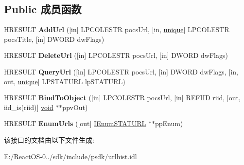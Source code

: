 \subsection*{Public 成员函数}
\begin{DoxyCompactItemize}
\item 
\mbox{\label{interface_i_url_history_stg_a1ce772b52c50301726ed33bfd9731d3a}} 
H\+R\+E\+S\+U\+LT {\bfseries Add\+Url} (\mbox{[}in\mbox{]} L\+P\+C\+O\+L\+E\+S\+TR pocs\+Url, \mbox{[}in, \hyperlink{interfaceunique}{unique}\mbox{]} L\+P\+C\+O\+L\+E\+S\+TR pocs\+Title, \mbox{[}in\mbox{]} D\+W\+O\+RD dw\+Flags)
\item 
\mbox{\label{interface_i_url_history_stg_aa5f15d49b1c791fb9435e4ef1073bdce}} 
H\+R\+E\+S\+U\+LT {\bfseries Delete\+Url} (\mbox{[}in\mbox{]} L\+P\+C\+O\+L\+E\+S\+TR pocs\+Url, \mbox{[}in\mbox{]} D\+W\+O\+RD dw\+Flags)
\item 
\mbox{\label{interface_i_url_history_stg_a878eb193e975aecdee844a29ce9cd069}} 
H\+R\+E\+S\+U\+LT {\bfseries Query\+Url} (\mbox{[}in\mbox{]} L\+P\+C\+O\+L\+E\+S\+TR pocs\+Url, \mbox{[}in\mbox{]} D\+W\+O\+RD dw\+Flags, \mbox{[}in, out, \hyperlink{interfaceunique}{unique}\mbox{]} L\+P\+S\+T\+A\+T\+U\+RL lp\+S\+T\+A\+T\+U\+RL)
\item 
\mbox{\label{interface_i_url_history_stg_ac17b470936757afb14dbbe6763c3613d}} 
H\+R\+E\+S\+U\+LT {\bfseries Bind\+To\+Object} (\mbox{[}in\mbox{]} L\+P\+C\+O\+L\+E\+S\+TR pocs\+Url, \mbox{[}in\mbox{]} R\+E\+F\+I\+ID riid, \mbox{[}out, iid\+\_\+is(riid)\mbox{]} \hyperlink{interfacevoid}{void} $\ast$$\ast$ppv\+Out)
\item 
\mbox{\label{interface_i_url_history_stg_a1603f279aef20f5f8f8cf6f038ee1a91}} 
H\+R\+E\+S\+U\+LT {\bfseries Enum\+Urls} (\mbox{[}out\mbox{]} \hyperlink{interface_i_enum_s_t_a_t_u_r_l}{I\+Enum\+S\+T\+A\+T\+U\+RL} $\ast$$\ast$pp\+Enum)
\end{DoxyCompactItemize}


该接口的文档由以下文件生成\+:\begin{DoxyCompactItemize}
\item 
E\+:/\+React\+O\+S-\/0../sdk/include/psdk/urlhist.\+idl\end{DoxyCompactItemize}
